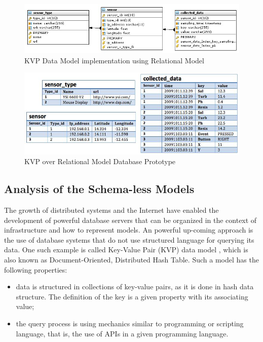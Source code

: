 \begin{figure}[!h]
  \centering
  \includegraphics[scale=0.6]{../diagrams/KVP-on-Relational-Model}
  \caption{KVP Data Model implementation using Relational Model}
  \label{fig:KVP-on-Relational-Model}
\end{figure}

\begin{figure}[!h]
  \centering
  \includegraphics[scale=0.75]{../diagrams/persistence-example-relational-kvp}
  \caption{KVP over Relational Model Database Prototype}
  \label{fig:persistence-example-relational-kvp}
\end{figure}

\subsection{Analysis of the Schema-less Models}

The growth of distributed systems and the Internet have enabled the development
of powerful database servers that can be organized in the context of
infrastructure and how to represent models. An powerful up-coming approach is
the use of database systems that do not use structured language for querying
its data. One such example is called Key-Value Pair (KVP) data model
\cite{db-kvp}, which is also known as Document-Oriented, Distributed Hash
Table. Such a model has the following properties:

\begin{itemize}
  \item data is structured in collections of key-value pairs, as it is done in
  hash data structure. The definition of the key is a given property with its
  associating value;
  \item the query process is using mechanics similar to programming or
  scripting language, that is, the use of APIs in a given programming language.
\end{itemize}

